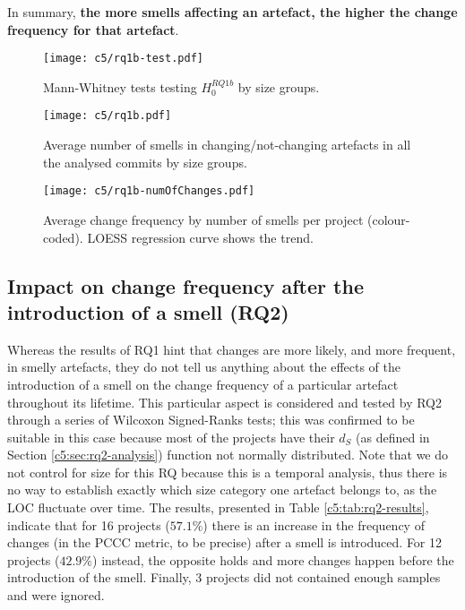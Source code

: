 In summary, \textbf{the more smells affecting an artefact, the higher the change frequency for that artefact}. 

\begin{figure}
    \centering
    \texttt{[image: c5/rq1b-test.pdf]}
    \caption{Mann-Whitney tests testing $H^{RQ1b}_0$ by size groups.} \label{c5:fig:rq1b-test}
\end{figure}

\begin{figure}
    \centering
    \texttt{[image: c5/rq1b.pdf]}
    \caption{Average number of smells in changing/not-changing artefacts in all the analysed commits by size groups.} \label{c5:fig:rq1b-density}
\end{figure}

\begin{figure}%
    \centering
    \texttt{[image: c5/rq1b-numOfChanges.pdf]}
    \caption{Average change frequency by number of smells per project (colour-coded). LOESS regression curve shows the trend.}%
    \label{c5:fig:rq1b-numsmells-size-freq}%
\end{figure}

\subsection{Impact on change frequency after the introduction of a smell (RQ2)}
Whereas the results of RQ1 hint that changes are more likely, and more frequent, in smelly artefacts, they do not tell us anything about the effects of the introduction of a smell on the change frequency of a particular artefact throughout its lifetime.
This particular aspect is considered and tested by RQ2 through a series of Wilcoxon Signed-Ranks tests; this was confirmed to be suitable in this case because most of the projects have their $d_S$  (as defined in Section \ref{c5:sec:rq2-analysis}) function not normally distributed.
Note that we do not control for size for this RQ because this is a temporal analysis, thus there is no way to establish exactly which size category one artefact belongs to, as the LOC fluctuate over time.
The results, presented in Table \ref{c5:tab:rq2-results}, indicate that for 16 projects ($57.1\%$) there is an increase in the frequency of changes (in the PCCC metric, to be precise) after a smell is introduced. For 12 projects ($42.9\%$) instead, the opposite holds and more changes happen before the introduction of the smell. Finally, 3 projects did not contained enough samples and were ignored.

